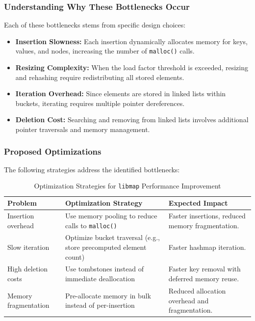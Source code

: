 \documentclass[titlepage]{article}
\begin{document}
\subsubsection{Understanding Why These Bottlenecks Occur}

Each of these bottlenecks stems from specific design choices:

\begin{itemize}
    \item \textbf{Insertion Slowness:} Each insertion dynamically allocates memory for keys, values, and nodes, increasing the number of \texttt{malloc()} calls.
    \item \textbf{Resizing Complexity:} When the load factor threshold is exceeded, resizing and rehashing require redistributing all stored elements.
    \item \textbf{Iteration Overhead:} Since elements are stored in linked lists within buckets, iterating requires multiple pointer dereferences.
    \item \textbf{Deletion Cost:} Searching and removing from linked lists involves additional pointer traversals and memory management.
\end{itemize}

\subsubsection{Proposed Optimizations}

The following strategies address the identified bottlenecks:

\begin{table}[h]
    \centering
    \renewcommand{\arraystretch}{1.3}
    \begin{tabular}{@{} l p{6cm} p{4cm} @{}}
        \toprule
        \textbf{Problem} & \textbf{Optimization Strategy} & \textbf{Expected Impact} \\
        \midrule
        Insertion overhead & Use memory pooling to reduce calls to \texttt{malloc()} & Faster insertions, reduced memory fragmentation. \\
        Slow iteration & Optimize bucket traversal (e.g., store precomputed element count) & Faster hashmap iteration. \\
        High deletion costs & Use tombstones instead of immediate deallocation & Faster key removal with deferred memory reuse. \\
        Memory fragmentation & Pre-allocate memory in bulk instead of per-insertion & Reduced allocation overhead and fragmentation. \\
        \bottomrule
    \end{tabular}
    \caption{Optimization Strategies for \texttt{libmap} Performance Improvement}
\end{table}
\end{document}
